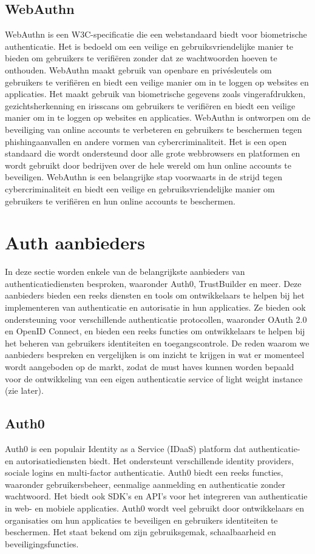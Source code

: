   \subsection{WebAuthn}%
  \label{subsec:webauthn}
  WebAuthn is een W3C-specificatie die een webstandaard biedt voor biometrische authenticatie. Het is bedoeld om een veilige en gebruiksvriendelijke manier te bieden om gebruikers te verifiëren zonder dat ze wachtwoorden hoeven te onthouden. WebAuthn maakt gebruik van openbare en privésleutels om gebruikers te verifiëren en biedt een veilige manier om in te loggen op websites en applicaties. Het maakt gebruik van biometrische gegevens zoals vingerafdrukken, gezichtsherkenning en irisscans om gebruikers te verifiëren en biedt een veilige manier om in te loggen op websites en applicaties. WebAuthn is ontworpen om de beveiliging van online accounts te verbeteren en gebruikers te beschermen tegen phishingaanvallen en andere vormen van cybercriminaliteit. Het is een open standaard die wordt ondersteund door alle grote webbrowsers en platformen en wordt gebruikt door bedrijven over de hele wereld om hun online accounts te beveiligen. WebAuthn is een belangrijke stap voorwaarts in de strijd tegen cybercriminaliteit en biedt een veilige en gebruiksvriendelijke manier om gebruikers te verifiëren en hun online accounts te beschermen.
  
  
  
  \section{Auth aanbieders}%
  \label{sec:auth-aanbieders}
  In deze sectie worden enkele van de belangrijkste aanbieders van authenticatiediensten besproken, waaronder Auth0, TrustBuilder en meer. Deze aanbieders bieden een reeks diensten en tools om ontwikkelaars te helpen bij het implementeren van authenticatie en autorisatie in hun applicaties. Ze bieden ook ondersteuning voor verschillende authenticatie protocollen, waaronder OAuth 2.0 en OpenID Connect, en bieden een reeks functies om ontwikkelaars te helpen bij het beheren van gebruikers identiteiten en toegangscontrole.
  De reden waarom we aanbieders bespreken en vergelijken is om inzicht te krijgen in wat er momenteel wordt aangeboden op de markt, zodat de must haves kunnen worden bepaald voor de ontwikkeling van een eigen authenticatie service of light weight instance (zie later).
  
  
  \subsection{Auth0}%
  \label{subsec:auth0}
  Auth0 is een populair Identity as a Service (IDaaS) platform dat authenticatie- en autorisatiediensten biedt. Het ondersteunt verschillende identity providers, sociale logins en multi-factor authenticatie. Auth0 biedt een reeks functies, waaronder gebruikersbeheer, eenmalige aanmelding en authenticatie zonder wachtwoord. Het biedt ook SDK's en API's voor het integreren van authenticatie in web- en mobiele applicaties. Auth0 wordt veel gebruikt door ontwikkelaars en organisaties om hun applicaties te beveiligen en gebruikers identiteiten te beschermen. Het staat bekend om zijn gebruiksgemak, schaalbaarheid en beveiligingsfuncties.

